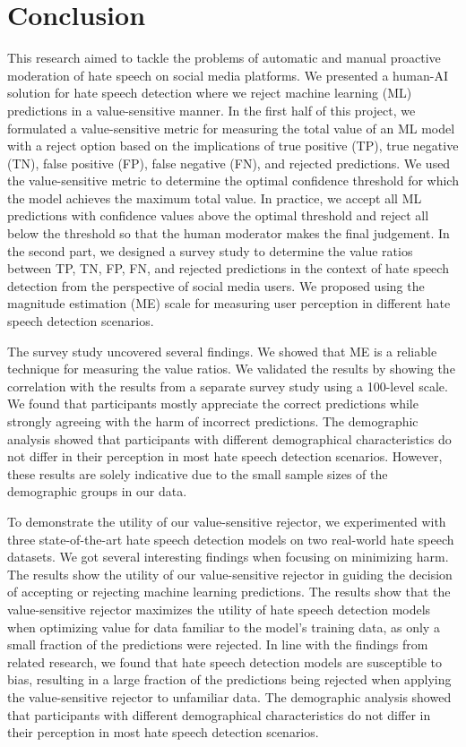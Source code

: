 \chapter{Conclusion}
\label{ch:conclusion}
This research aimed to tackle the problems of automatic and manual proactive moderation of hate speech on social media platforms.
%
We presented a human-AI solution for hate speech detection where we reject machine learning (ML) predictions in a value-sensitive manner.
%
In the first half of this project, we formulated a value-sensitive metric for measuring the total value of an ML model with a reject option based on the implications of true positive (TP), true negative (TN), false positive (FP), false negative (FN), and rejected predictions.
%
We used the value-sensitive metric to determine the optimal confidence threshold for which the model achieves the maximum total value.
%
In practice, we accept all ML predictions with confidence values above the optimal threshold and reject all below the threshold so that the human moderator makes the final judgement.
%
In the second part, we designed a survey study to determine the value ratios between TP, TN, FP, FN, and rejected predictions in the context of hate speech detection from the perspective of social media users.
%
We proposed using the magnitude estimation (ME) scale for measuring user perception in different hate speech detection scenarios.
%

%
The survey study uncovered several findings.
%
We showed that ME is a reliable technique for measuring the value ratios.
%
We validated the results by showing the correlation with the results from a separate survey study using a 100-level scale.
%
We found that participants mostly appreciate the correct predictions while strongly agreeing with the harm of incorrect predictions.
%
The demographic analysis showed that participants with different demographical characteristics do not differ in their perception in most hate speech detection scenarios.
%
However, these results are solely indicative due to the small sample sizes of the demographic groups in our data.
%

%
To demonstrate the utility of our value-sensitive rejector, we experimented with three state-of-the-art hate speech detection models on two real-world hate speech datasets.
%
We got several interesting findings when focusing on minimizing harm.
%
The results show the utility of our value-sensitive rejector in guiding the decision of accepting or rejecting machine learning predictions.
%
The results show that the value-sensitive rejector maximizes the utility of hate speech detection models when optimizing value for data familiar to the model's training data, as only a small fraction of the predictions were rejected.
%
In line with the findings from related research, we found that hate speech detection models are susceptible to bias, resulting in a large fraction of the predictions being rejected when applying the value-sensitive rejector to unfamiliar data.
%
The demographic analysis showed that participants with different demographical characteristics do not differ in their perception in most hate speech detection scenarios.
%
